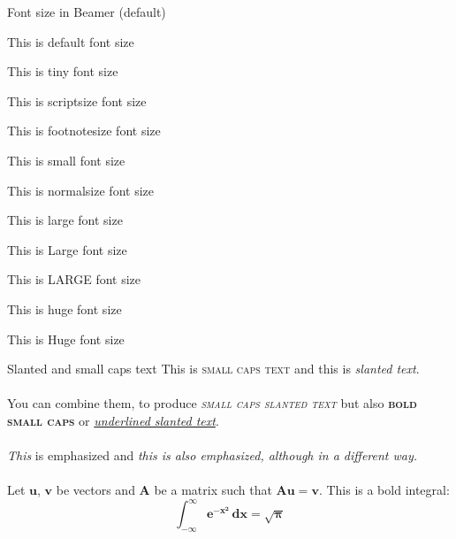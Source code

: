 \documentclass{beamer}
\begin{document}
\begin{frame}{Font size in Beamer (default)}


This is default font size

\tiny This is tiny font size

\scriptsize This is scriptsize font size

\footnotesize This is footnotesize font size

\small This is small font size

\normalsize This is normalsize font size

\large This is large font size

\Large This is Large font size

\LARGE This is LARGE font size

\huge This is huge font size

\Huge This is Huge font size

\end{frame}

\begin{frame}{Slanted and small caps text}
This is \textsc{small caps text} and this is
\textsl{slanted text}.\\~\\
You can combine them, to produce \textsl{\textsc{small
caps slanted text}} but also \textsc{\textbf{bold small caps}} or \textsl{\underline{underlined slanted text}}.\\~\\


\emph{This} is emphasized and \textit{\emph{this} is
also emphasized, although in a different way.}\\~\\


Let $\bm{u}$, $\bm{v}$ be vectors and $\bm{A}$ be a
matrix such that $\bm{Au}=\bm{v}$.
This is a bold integral:
\[
\bm{\int_{-\infty}^{\infty} e^{-x^2}\,dx=\sqrt{\pi} }
\]
\end{frame}
\end{document}
